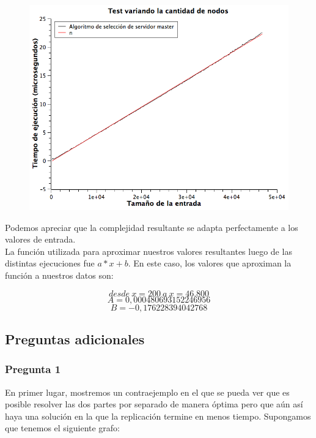 \begin{figure}[H]
\begin{center}
	\includegraphics[width=350pt]{../tests/ej2/EJ2-nodo-var.png}
\end{center}
\end{figure}

Podemos apreciar que la complejidad resultante se adapta perfectamente a los valores de entrada.\\

La función utilizada para aproximar nuestros valores resultantes luego de las distintas ejecuciones fue $a*x+b$.
En este caso, los valores que aproximan la función a nuestros datos son:

$$desde\ x = 200\ a\ x = 46.800$$
$$A  = 0,000480693152246956$$
$$B  = -0,176228394042768$$


\subsection{Preguntas adicionales}

\subsubsection{Pregunta 1}
En primer lugar, mostremos un contraejemplo en el que se pueda ver que es posible resolver las dos partes por separado de manera óptima pero que aún así haya una solución en la que la replicación termine en menos tiempo.\newline
\newline
Supongamos que tenemos el siguiente grafo:\newline

